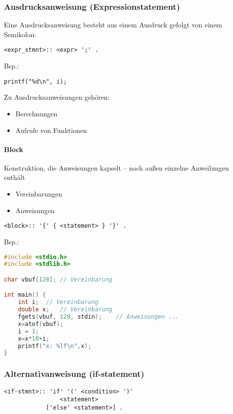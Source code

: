 \subsubsection[Ausdrucksanweisung]{Ausdrucksanweisung (Expressionstatement)}
Eine Ausdrucksanweisung besteht aus einem Ausdruck gefolgt von einem Semikolon:
\begin{lstlisting}
<expr_stmnt>:: <expr> ';' .
\end{lstlisting}

Bsp.:
\begin{lstlisting}
printf("%d\n", i);
\end{lstlisting}
Zu Ausdrucksanweisungen gehören:
\begin{itemize}
\item Berechnungen
\item Aufrufe von Funktionen
\end{itemize}
\paragraph{Block}
Konstruktion, die Anweisungen kapselt -- nach außen einzelne Anweilungen enthält
\begin{itemize}
\item Vereinbarungen
\item Anweisungen
\end{itemize}
\begin{lstlisting}
<block>:: '{' { <statement> } '}' .
\end{lstlisting}

Bsp.:
\begin{lstlisting}[language=C]
#include <stdio.h>
#include <stdlib.h>

char vbuf[128];	// Vereinbarung

int main() {
	int i;	// Vereinbarung
	double x;	// Vereinbarung
	fgets(vbuf, 128, stdin);	// Anweisungen ...
	x=atof(vbuf);
	i = 1;
	x=x*10+i;
	printf("x: %lf\n",x);
}
\end{lstlisting}

\subsubsection[Alternativanweisung]{Alternativanweisung (if-statement)}

\begin{lstlisting}
<if-stmnt>:: 'if' '(' <condition> ')' 
				<statement>
			['else' <statement>] .
\end{lstlisting}

